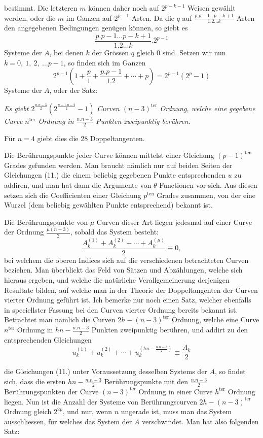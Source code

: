 \documentclass{article}
\begin{document}
bestimmt. Die letzteren $m$ können daher noch auf $2^{p-k-1}$ Weisen gewählt werden, oder die $m$ im Ganzen auf $2^{p-1}$ Arten. Da die $q$ auf $\frac{p.p-1\ldots p-k+1}{1.2\ldots k}$ Arten den angegebenen Bedingungen genügen können, so giebt es
\[
\frac{p.p-1\ldots p-k+1}{1.2\ldots k}.2^{p-1}
\]
Systeme der $A$, bei denen $k$ der Grössen $q$ gleich 0 sind. Setzen wir nun $k = 0,\ 1,\ 2,\ \ldots p-1$, so finden sich im Ganzen
\[
2^{p-1}\left(1+\frac{p}{1}+\frac{p.p-1}{1.2}+\cdots+p\right) = 2^{p-1}(2^{p}-1)
\]
Systeme der $A$, oder der Satz:

\emph{Es giebt $2^{\frac{n.n-3}{2}}\left(2^{\frac{n-1.n-2}{2}}-1\right)$ Curven $(n-3)^{\text{ter}}$ Ordnung, welche eine gegebene Curve $n^{\text{ter}}$ Ordnung in $\frac{n.n-3}{2}$ Punkten zweipunktig berühren.}

Für $n=4$ giebt dies die 28 Doppeltangenten.

Die Berührungspunkte jeder Curve können mittelst einer Gleichung $(p-1)^{\text{ten}}$ Grades gefunden werden. Man braucht nämlich nur auf beiden Seiten der Gleichungen (11.) die einem beliebig gegebenen Punkte entsprechenden $u$ zu addiren, und man hat dann die Argumente von $\theta$-Functionen vor sich. Aus diesen setzen sich die Coefficienten einer Gleichung $p^{\text{ten}}$ Grades zusammen, von der eine Wurzel (dem beliebig gewählten Punkte entsprechend) bekannt ist.

Die Berührungspunkte von $\mu$ Curven dieser Art liegen jedesmal auf einer Curve der Ordnung $\frac{\mu(n-3)}{2}$, sobald das System besteht:
\[
\frac{A_{k}^{(1)}+A_{k}^{(2)}+\cdots+A_{k}^{(\mu)}}{2} \equiv 0,
\]
bei welchem die oberen Indices sich auf die verschiedenen betrachteten Curven beziehen. Man überblickt das Feld von Sätzen und Abzählungen, welche sich hieraus ergeben, und welche die natürliche Verallgemeinerung derjenigen Resultate bilden, auf welche man in der Theorie der Doppeltangenten der Curven vierter Ordnung geführt ist. Ich bemerke nur noch einen Satz, welcher ebenfalls in speciellster Fassung bei den Curven vierter Ordnung bereits bekannt ist. Betrachtet man nämlich die Curven $2h-(n-3)^{\text{ter}}$ Ordnung, welche eine Curve $n^{\text{ter}}$ Ordnung in $hn-\frac{n.n-3}{2}$ Punkten zweipunktig berühren, und addirt zu den entsprechenden Gleichungen
\[
u_{k}^{(1)}+u_{k}^{(2)}+\cdots+u_{k}^{\left(hn-\frac{n.n-3}{2}\right)} \equiv \frac{A_{k}}{2}
\]

die Gleichungen (11.) unter Voraussetzung desselben Systems der $A$, so findet sich, dass die ersten $hn-\frac{n.n-3}{2}$ Berührungspunkte mit den $\frac{n.n-3}{2}$ Berührungspunkten der Curve $(n-3)^{\text{ter}}$ Ordnung in einer Curve $h^{\text{ter}}$ Ordnung liegen. Nun ist die Anzahl der Systeme von Berührungscurven $2h-(n-3)^{\text{ter}}$ Ordnung gleich $2^{2p}$, und nur, wenn $n$ ungerade ist, muss man das System ausschliessen, für welches das System der $A$ verschwindet. Man hat also folgenden Satz:
\end{document}
